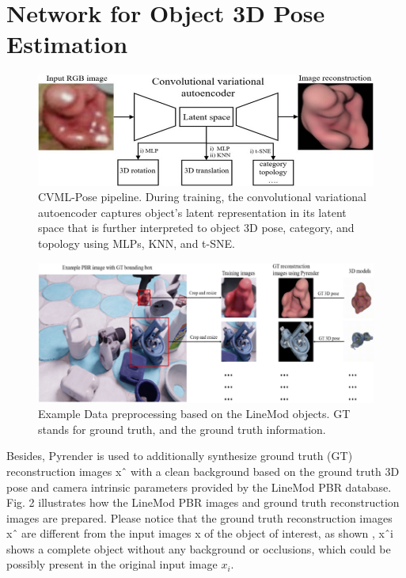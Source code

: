 \documentclass[9pt,a4paper,twoside]{tau}
\begin{document}
\section{Network for Object 3D Pose Estimation }
\begin{figure}[H]
                \centering
                \includegraphics[width=0.8\columnwidth]{Figures/Picture1.jpg}
                \caption{CVML-Pose pipeline. During training, the convolutional variational autoencoder captures object’s latent representation in its latent space that is further interpreted to object 3D pose, category, and topology using MLPs, KNN, and t-SNE.}
                \label{fig:figure}
            \end{figure}
\begin{figure}[H]
                \centering
                \includegraphics[width=0.8\columnwidth]{Figures/Picture2.png}
                \caption{Example Data preprocessing based on the LineMod  objects. GT stands for ground truth, and the ground truth information.}
                \label{fig:figure}
            \end{figure}
        Besides, Pyrender is used to additionally synthesize ground truth (GT) reconstruction images xˆ with a clean background based on the ground truth 3D pose and camera intrinsic parameters provided by the LineMod PBR database. Fig. 2 illustrates how the LineMod PBR images and ground truth reconstruction images are prepared. Please notice that the ground truth reconstruction images xˆ are different from the input images x of the object of interest, as shown , xˆi shows a complete object without any background or occlusions, which could be possibly present in the original input image $x_i.$
        
\end{document}
